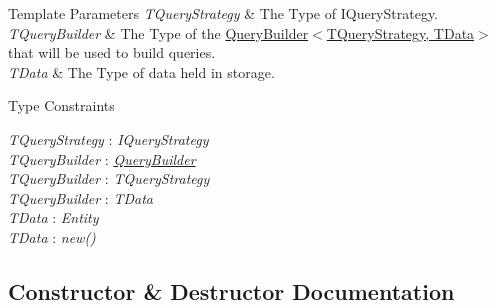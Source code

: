 \begin{DoxyTemplParams}{Template Parameters}
{\em T\+Query\+Strategy} & The Type of I\+Query\+Strategy.\\
\hline
{\em T\+Query\+Builder} & The Type of the \hyperlink{classCqrs_1_1Repositories_1_1Repository_a4447451b7dbcfcd68dfa3fa65a41f357_a4447451b7dbcfcd68dfa3fa65a41f357}{Query\+Builder$<$\+T\+Query\+Strategy, T\+Data$>$} that will be used to build queries.\\
\hline
{\em T\+Data} & The Type of data held in storage.\\
\hline
\end{DoxyTemplParams}
\begin{Desc}
\item[Type Constraints]\begin{description}
\item[{\em T\+Query\+Strategy} : {\em I\+Query\+Strategy}]\item[{\em T\+Query\+Builder} : {\em \hyperlink{classCqrs_1_1Repositories_1_1Repository_a4447451b7dbcfcd68dfa3fa65a41f357_a4447451b7dbcfcd68dfa3fa65a41f357}{Query\+Builder}}]\item[{\em T\+Query\+Builder} : {\em T\+Query\+Strategy}]\item[{\em T\+Query\+Builder} : {\em T\+Data}]\item[{\em T\+Data} : {\em Entity}]\item[{\em T\+Data} : {\em new()}]\end{description}
\end{Desc}


\subsection{Constructor \& Destructor Documentation}
\mbox{\label{classCqrs_1_1Azure_1_1BlobStorage_1_1Repositories_1_1BlobStorageRepository_a11ec03d2f22e21b2a84556fd26077909_a11ec03d2f22e21b2a84556fd26077909}} 
